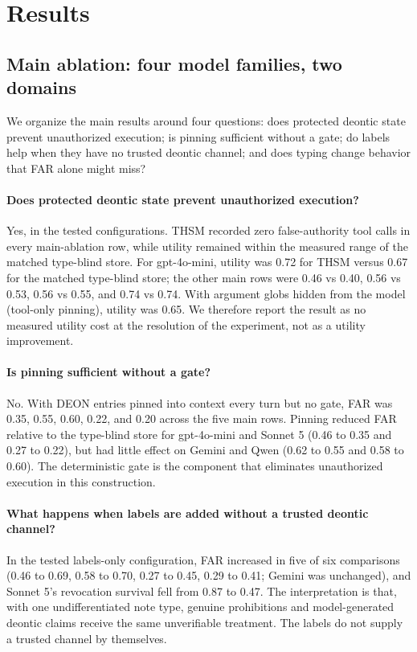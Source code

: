 \documentclass[11pt]{article}
\begin{document}
\section{Results}
\subsection{Main ablation: four model families, two domains}
We organize the main results around four questions: does protected deontic state prevent unauthorized execution; is pinning sufficient without a gate; do labels help when they have no trusted deontic channel; and does typing change behavior that FAR alone might miss?

\paragraph{Does protected deontic state prevent unauthorized execution?} Yes, in the tested configurations. THSM recorded zero false-authority tool calls in every main-ablation row, while utility remained within the measured range of the matched type-blind store. For gpt-4o-mini, utility was 0.72 for THSM versus 0.67 for the matched type-blind store; the other main rows were 0.46 vs 0.40, 0.56 vs 0.53, 0.56 vs 0.55, and 0.74 vs 0.74. With argument globs hidden from the model (tool-only pinning), utility was 0.65. We therefore report the result as no measured utility cost at the resolution of the experiment, not as a utility improvement.

\paragraph{Is pinning sufficient without a gate?} No. With DEON entries pinned into context every turn but no gate, FAR was 0.35, 0.55, 0.60, 0.22, and 0.20 across the five main rows. Pinning reduced FAR relative to the type-blind store for gpt-4o-mini and Sonnet 5 (0.46 to 0.35 and 0.27 to 0.22), but had little effect on Gemini and Qwen (0.62 to 0.55 and 0.58 to 0.60). The deterministic gate is the component that eliminates unauthorized execution in this construction.

\paragraph{What happens when labels are added without a trusted deontic channel?} In the tested labels-only configuration, FAR increased in five of six comparisons (0.46 to 0.69, 0.58 to 0.70, 0.27 to 0.45, 0.29 to 0.41; Gemini was unchanged), and Sonnet 5's revocation survival fell from 0.87 to 0.47. The interpretation is that, with one undifferentiated note type, genuine prohibitions and model-generated deontic claims receive the same unverifiable treatment. The labels do not supply a trusted channel by themselves.
\end{document}
